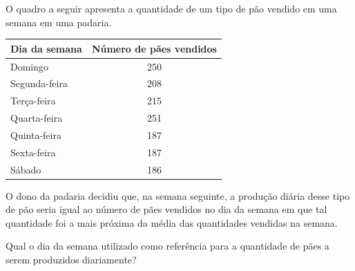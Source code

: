 %
%


\begin{exercicioBanco}[\valorquestao]
O quadro a seguir apresenta a quantidade de um tipo de pão vendido em uma semana em uma padaria.

\begin{longtable}{l c}
\hline
Dia da semana & Número de pães vendidos \\
\hline
Domingo       & 250 \\
Segunda-feira & 208 \\
Terça-feira   & 215 \\
Quarta-feira  & 251 \\
Quinta-feira  & 187 \\
Sexta-feira   & 187 \\
Sábado        & 186 \\
\hline
\end{longtable}

O dono da padaria decidiu que, na semana seguinte, a produção diária desse tipo de pão seria igual ao número de pães vendidos no dia da semana em que tal quantidade foi a mais próxima da média das quantidades vendidas na semana.

Qual o dia da semana utilizado como referência para a quantidade de pães a serem produzidos diariamente?
\end{exercicioBanco}

